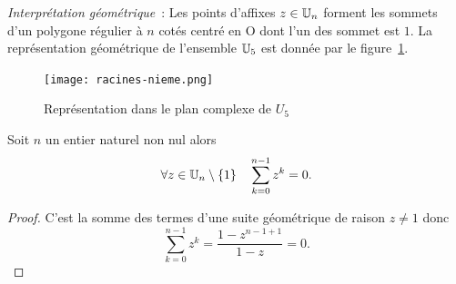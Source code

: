 \emph{Interprétation géométrique}~: Les points d'affixes \(z \in \mathbb{U}_n\) forment les sommets d'un polygone régulier à \(n\) cotés centré en O dont l'un des sommet est \(1\). La représentation géométrique de l'ensemble \(\mathbb{U}_5\) est donnée par le figure~\ref{fig:racinesnieme}.
\begin{figure}
  \centering
  \texttt{[image: racines-nieme.png]}
  \caption{Représentation dans le plan complexe de \(U_5\)}
  \label{fig:racinesnieme}
\end{figure}

\begin{theo}
  Soit \(n\) un entier naturel non nul alors
  \begin{equation}
    \forall z \in \mathbb{U}_n \setminus \{1\} \quad \sum_{k=0}^{n-1} z^k = 0.
  \end{equation}
\end{theo}
\begin{proof}
  C'est la somme des termes d'une suite géométrique de raison \(z \neq 1\) donc
  \begin{equation}
    \sum_{k=0}^{n-1} z^k = \frac{1-z^{n-1+1}}{1-z} = 0.
  \end{equation}
\end{proof}

